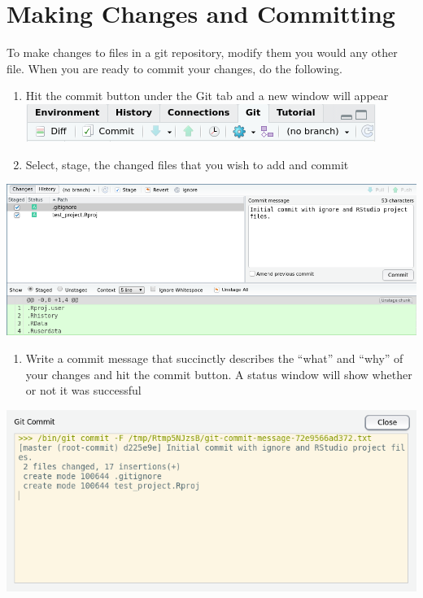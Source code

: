 \documentclass[
]{book}
\providecommand{\tightlist}{%
  \setlength{\itemsep}{0pt}\setlength{\parskip}{0pt}}
\begin{document}
\hypertarget{making-changes-and-committing}{%
\section{Making Changes and Committing}\label{making-changes-and-committing}}

To make changes to files in a git repository, modify them you would any other file. When you are ready to commit your changes, do the following.

\begin{enumerate}
\def\labelenumi{\arabic{enumi}.}
\item
  Hit the commit button under the Git tab and a new window will appear
  \includegraphics{images/02-commit_1.png}
\item
  Select, stage, the changed files that you wish to add and commit
\end{enumerate}

\includegraphics{images/02-commit_2.png}

\begin{enumerate}
\def\labelenumi{\arabic{enumi}.}
\setcounter{enumi}{2}
\tightlist
\item
  Write a commit message that succinctly describes the ``what'' and ``why'' of your changes and hit the commit button. A status window will show whether or not it was successful
\end{enumerate}

\includegraphics{images/02-commit_3.png}
\end{document}
